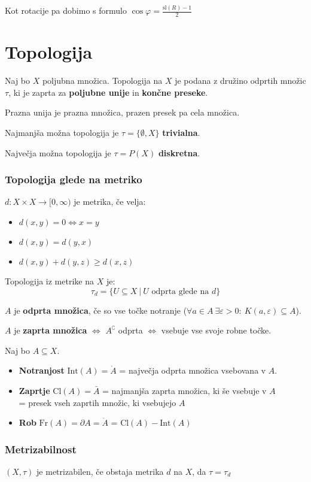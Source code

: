 Kot rotacije pa dobimo s formulo $\cos \varphi = \frac{\text{sl}(R) - 1}{2}$

\section*{Topologija}

Naj bo $X$ poljubna množica. Topologija na $X$ je podana z družino odprtih množic $\tau$, ki je zaprta za \textbf{poljubne unije} in \textbf{končne preseke}.

Prazna unija je prazna množica, prazen presek pa cela množica.

Najmanjša možna topologija je $\tau = \{\emptyset, X\}$ \textbf{trivialna}.

Največja možna topologija je $\tau = P(X)$ \textbf{diskretna}.

\subsubsection*{Topologija glede na metriko}
$d: X \times X \to [0,\infty)$ je metrika, če velja:
\begin{itemize}
	\item $d(x, y) = 0 \iff x = y$
	\item $d(x, y) = d(y, x)$
	\item $d(x, y) + d(y, z) \geq d(x, z)$
\end{itemize}
Topologija iz metrike na $X$ je:
\[ \tau_d = \{ U \subseteq X\ |\ U \text{ odprta glede na } d\}\]

$A$ je \textbf{odprta množica}, če so vse točke notranje ($\forall a \in A\ \exists \varepsilon > 0:\ K(a, \varepsilon) \subseteq A$).

$A$ je \textbf{zaprta množica} $\iff$ $A^{\complement}$ odprta $\iff$ vsebuje vse svoje robne točke. 

Naj bo $A \subseteq X$.
\begin{itemize}
	\item \textbf{Notranjost} $\text{Int}(A) = \mathring{A}$ = največja odprta množica vsebovana v $A$.
	\item \textbf{Zaprtje} $\text{Cl}(A) = \bar{A}$ = najmanjša zaprta množica, ki še vsebuje v $A$ \\
			= presek vseh zaprtih množic, ki vsebujejo $A$
	\item  \textbf{Rob} $\text{Fr}(A) = \partial A = \dot{A}$ = $\text{Cl}(A) - \text{Int}(A)$
\end{itemize}

\subsubsection*{Metrizabilnost}
$(X, \tau)$ je metrizabilen, če obstaja metrika $d$ na $X$, da $\tau = \tau_d$

